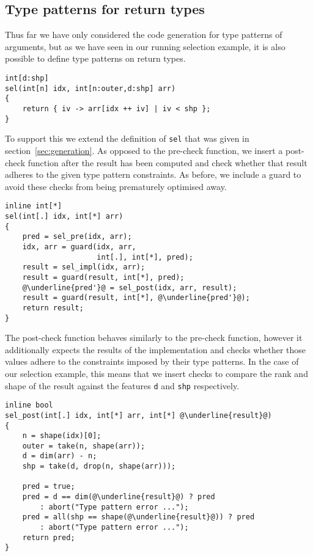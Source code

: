 
\subsection{Type patterns for return types}

Thus far we have only considered the code generation for type patterns of arguments, but as we have seen in our running selection example, it is also possible to define type patterns on return types.
\begin{lstlisting}
int[d:shp]
sel(int[n] idx, int[n:outer,d:shp] arr)
{
    return { iv -> arr[idx ++ iv] | iv < shp };
}
\end{lstlisting}

\noindent
To support this we extend the definition of \texttt{sel} that was given in section~\ref{sec:generation}.
As opposed to the pre-check function, we insert a post-check function after the result has been computed and check whether that result adheres to the given type pattern constraints.
As before, we include a guard to avoid these checks from being prematurely optimised away.
\begin{lstlisting}[escapechar=@]
inline int[*]
sel(int[.] idx, int[*] arr)
{
    pred = sel_pre(idx, arr);
    idx, arr = guard(idx, arr,
                     int[.], int[*], pred);
    result = sel_impl(idx, arr);
    result = guard(result, int[*], pred);
    @\underline{pred'}@ = sel_post(idx, arr, result);
    result = guard(result, int[*], @\underline{pred'}@);
    return result;
}
\end{lstlisting}

\noindent
The post-check function behaves similarly to the pre-check function, however it additionally expects the results of the implementation and checks whether those values adhere to the constraints imposed by their type patterns.
In the case of our selection example, this means that we insert checks to compare the rank and shape of the result against the features \texttt{d} and \texttt{shp} respectively.
\begin{lstlisting}[escapechar=@]
inline bool
sel_post(int[.] idx, int[*] arr, int[*] @\underline{result}@)
{
    n = shape(idx)[0];
    outer = take(n, shape(arr));
    d = dim(arr) - n;
    shp = take(d, drop(n, shape(arr)));

    pred = true;
    pred = d == dim(@\underline{result}@) ? pred
        : abort("Type pattern error ...");
    pred = all(shp == shape(@\underline{result}@)) ? pred
        : abort("Type pattern error ...");
    return pred;
}
\end{lstlisting}

